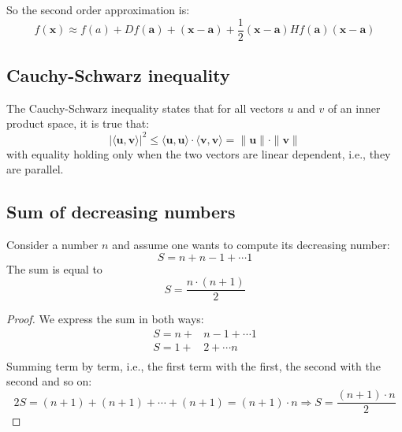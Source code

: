 \documentclass[12pt, letterpaper]{article}
\theoremstyle{definition}
\newcommand{\x}{\mathbf{x}}
\begin{document}
So the second order approximation is:
\begin{equation}
f(\x) \approx f(a) + Df(\mathbf{a}) + (\x -\mathbf{a}) + \frac{1}{2}(\x-\mathbf{a})Hf(\mathbf{a})(\x-\mathbf{a})
\end{equation}

\subsection{Cauchy-Schwarz inequality}
\label{sec:CauchySchwarz}
The Cauchy-Schwarz inequality states that for all vectors $u$ and $v$ of an inner product space, it is true that:
\begin{equation}
\left| \langle \mathbf{u}, \mathbf{v} \rangle \right|^2 \le \langle \mathbf{u}, \mathbf{u} \rangle\cdot \langle \mathbf{v}, \mathbf{v} \rangle = \| \mathbf{u}\| \cdot \| \mathbf{v}\|
\end{equation}
with equality holding only when the two vectors are linear dependent, i.e., they are parallel.

\subsection{Sum of decreasing numbers}
\label{sec:SumDecreasingNumber}
Consider a number $n$ and assume one wants to compute its decreasing number:
\begin{equation}
S = n + n-1 +\cdots 1
\end{equation}
The sum is equal to
\begin{equation}
S = \frac{n\cdot (n+1)}{2}
\end{equation}
\begin{proof}
We express the sum in both ways:
\begin{equation}
\begin{aligned}
S = n + &n-1 +\cdots 1\\
S = 1 + &2 +\cdots n\\
\end{aligned}
\end{equation}
Summing term by term, i.e., the first term with the first, the second with the second and so on:
\begin{equation}
2S = (n+1) + (n+1) + \cdots + (n+1) = (n+1) \cdot n \Rightarrow S = \frac{(n+1) \cdot n}{2}
\end{equation}
\end{proof}
\end{document}
